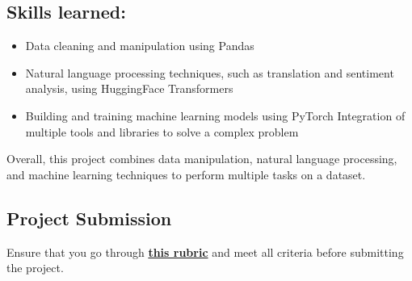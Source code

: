 \subsection{Skills learned:}

\begin{itemize}
    \item Data cleaning and manipulation using Pandas
    \item Natural language processing techniques, such as translation and sentiment analysis, using HuggingFace Transformers
    \item Building and training machine learning models using PyTorch Integration of multiple tools and libraries to solve a complex problem
\end{itemize}
Overall, this project combines data manipulation, natural language processing, and machine learning techniques to perform multiple tasks on a dataset.

\subsection{Project Submission}

Ensure that you go through \href{https://learn.udacity.com/rubric/5164}{\textbf{this rubric}} and meet all criteria before submitting the project.
